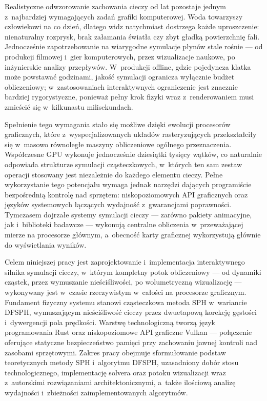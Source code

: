 Realistyczne odwzorowanie zachowania cieczy od lat pozostaje jednym
z~najbardziej wymagających zadań grafiki komputerowej. Woda towarzyszy
człowiekowi na co dzień, dlatego widz natychmiast dostrzega każde uproszczenie:
nienaturalny rozprysk, brak załamania światła czy zbyt gładką powierzchnię fali.
Jednocześnie zapotrzebowanie na wiarygodne symulacje płynów stale rośnie ---
od produkcji filmowej i~gier komputerowych, przez wizualizacje naukowe,
po inżynierskie analizy przepływów. W~produkcji offline, gdzie pojedyncza klatka
może powstawać godzinami, jakość symulacji ogranicza wyłącznie budżet
obliczeniowy; w~zastosowaniach interaktywnych ograniczenie jest znacznie
bardziej rygorystyczne, ponieważ pełny krok fizyki wraz z~renderowaniem musi
zmieścić się w~kilkunastu milisekundach.

Spełnienie tego wymagania stało się możliwe dzięki ewolucji procesorów
graficznych, które z~wyspecjalizowanych układów rasteryzujących przekształciły
się w~masowo równoległe maszyny obliczeniowe ogólnego przeznaczenia.
Współczesne GPU wykonuje jednocześnie dziesiątki tysięcy wątków, co naturalnie
odpowiada strukturze symulacji cząsteczkowych, w~których ten sam zestaw operacji
stosowany jest niezależnie do każdego elementu cieczy. Pełne wykorzystanie tego
potencjału wymaga jednak narzędzi dających programiście bezpośrednią kontrolę
nad sprzętem: niskopoziomowych API graficznych oraz języków systemowych
łączących wydajność z~gwarancjami poprawności. Tymczasem dojrzałe systemy
symulacji cieczy --- zarówno pakiety animacyjne, jak i~biblioteki badawcze ---
wykonują centralne obliczenia w~przeważającej mierze na procesorze głównym,
a~obecność karty graficznej wykorzystują głównie do wyświetlania wyników.

Celem niniejszej pracy jest zaprojektowanie i~implementacja interaktywnego
silnika symulacji cieczy, w~którym kompletny potok obliczeniowy --- od dynamiki
cząstek, przez wymuszanie nieściśliwości, po wolumetryczną wizualizację ---
wykonywany jest w~czasie rzeczywistym w~całości na procesorze graficznym.
Fundament fizyczny systemu stanowi cząsteczkowa metoda SPH w~wariancie DFSPH,
wymuszającym nieściśliwość cieczy przez dwuetapową korekcję gęstości
i~dywergencji pola prędkości. Warstwę technologiczną tworzą język programowania
Rust oraz niskopoziomowe API graficzne Vulkan --- połączenie oferujące
statyczne bezpieczeństwo pamięci przy zachowaniu jawnej kontroli nad zasobami
sprzętowymi. Zakres pracy obejmuje sformułowanie podstaw teoretycznych metody
SPH i~algorytmu DFSPH, uzasadniony dobór stosu technologicznego, implementację
solvera oraz potoku wizualizacji wraz z~autorskimi rozwiązaniami
architektonicznymi, a~także ilościową analizę wydajności i~zbieżności
zaimplementowanych algorytmów.

